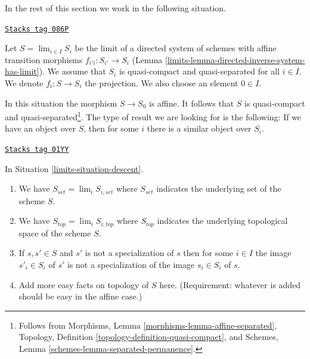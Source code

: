In the rest of this section we work in the following situation.

\begin{definition}
\label{limits-situation-descent}
\href{https://stacks.math.columbia.edu/tag/086P}{\texttt{Stacks tag 086P}}

Let $S = \lim_{i \in I} S_i$ be the limit of a directed system of schemes
with affine transition morphisms $f_{i'i} : S_{i'} \to S_i$
(Lemma \ref{limits-lemma-directed-inverse-system-has-limit}).
We assume that $S_i$ is quasi-compact and quasi-separated for all $i \in I$.
We denote $f_i : S \to S_i$ the projection.
We also choose an element $0 \in I$.
\end{definition}

In this situation the morphism $S \to S_0$ is affine. It follows
that $S$ is quasi-compact and quasi-separated\footnote{Follows
from Morphisms, Lemma \ref{morphisms-lemma-affine-separated},
Topology, Definition \ref{topology-definition-quasi-compact}, and
Schemes, Lemma \ref{schemes-lemma-separated-permanence}.}.
The type of result we are looking for is the following:
If we have an object over $S$, then for some $i$ there is a
similar object over $S_i$.

\begin{lemma}
\label{limits-lemma-topology-limit}
\href{https://stacks.math.columbia.edu/tag/01YY}{\texttt{Stacks tag 01YY}}

In Situation \ref{limits-situation-descent}.
\begin{enumerate}
\item We have $S_{set} = \lim_i S_{i, set}$ where $S_{set}$
indicates the underlying set of the scheme $S$.
\item We have $S_{top} = \lim_i S_{i, top}$ where $S_{top}$
indicates the underlying topological space of the scheme $S$.
\item If $s, s' \in S$ and $s'$ is not a specialization of $s$
then for some $i \in I$ the image $s'_i \in S_i$ of $s'$ is not
a specialization of the image $s_i \in S_i$ of $s$.
\item Add more easy facts on topology of $S$ here.
(Requirement: whatever is added should be easy in the affine case.)
\end{enumerate}
\end{lemma}

